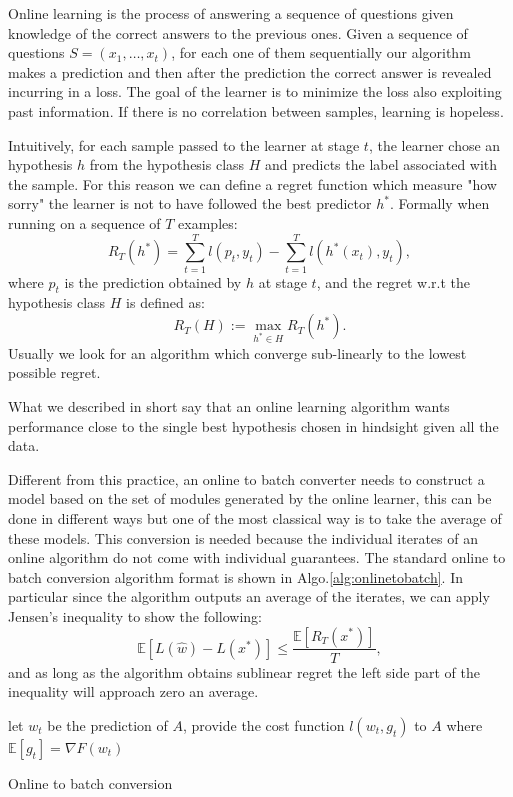 \documentclass[12pt]{article}
\theoremstyle{definition}
\begin{document}
Online learning is the process of answering a sequence of questions given knowledge of the correct answers to the previous ones. Given a sequence of questions $S=(x_1, \dots, x_t)$, for each one of them sequentially our algorithm makes a prediction and then after the prediction the correct answer is revealed incurring in a loss. The goal of the learner is to minimize the loss also exploiting past information. If there is no correlation between samples, learning is hopeless.

Intuitively, for each sample passed to the learner at stage $t$, the learner chose an hypothesis $h$ from the hypothesis class $H$ and predicts the label associated with the sample. For this reason we can define a regret function which measure "how sorry" the learner is not to have followed the best predictor $h^*$. Formally when running on a sequence of $T$ examples:
$$
	R_T(h^*) = \sum_{t=1}^{T} l(p_t,y_t) - \sum_{t=1}^{T} l(h^*(x_t),y_t),
$$
where $p_t$ is the prediction obtained by $h$ at stage $t$, and the regret w.r.t the hypothesis class $H$ is defined as:
$$
	R_T(H) := \max_{h^* \in H} R_T(h^*).
$$
Usually we look for an algorithm which converge sub-linearly to the lowest possible regret.

What we described in short say that an online learning algorithm wants performance close to the single best hypothesis chosen in hindsight given all the data.

Different from this practice, an online to batch converter needs to construct a model based on the set of modules generated by the online learner, this can be done in different ways but one of the most classical way is to take the average of these models. This conversion is needed because the individual iterates of an online algorithm do not come with individual guarantees. The standard online to batch conversion algorithm format is shown in Algo.\ref{alg:onlinetobatch}. In particular since the algorithm outputs an average of the iterates, we can apply Jensen's inequality to show the following:
$$
\mathbb{E}[L(\hat w) - L(x^*)] \leq \frac{\mathbb{E}[R_T(x^*)]}{T}, 
$$
and as long as the algorithm obtains sublinear regret the left side part of the inequality will approach zero an average.

\begin{algorithm}

      {
		let $w_t$ be the prediction of $A$, provide the cost function $l(w_t,g_t)$ to $A$
		where $\mathbb{E}[g_t] = \nabla F(w_t)$
      }
    \caption{Online to batch conversion }
    \label{alg:onlinetobatch}
\end{algorithm}
\end{document}
